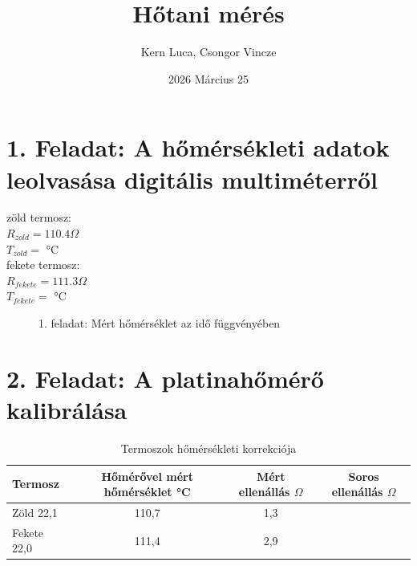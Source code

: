 \documentclass{article}
\title{Hőtani mérés}
\author{Kern Luca, Csongor Vincze}
\date{2026 Március 25}
\begin{document}
\maketitle

\section*{1. Feladat: A hőmérsékleti adatok leolvasása digitális multiméterről}

 
zöld termosz:\\
$R_{zold}=110.4 \Omega$\\
$T_{zold}= \text{ °C}$\\
fekete termosz:\\
$R_{fekete}=111.3 \Omega$\\
$T_{fekete}= \text{ °C}$\\


\begin{figure}[H]
    \centering
    \caption*{1. feladat: Mért hőmérséklet az idő függvényében}
    \label{}
\end{figure}

\section*{2. Feladat: A platinahőmérő kalibrálása}

\begin{table}[H]
    \centering
    \begin{tabular}{|l|c|c|c|}
        \hline
        Termosz & Hőmérővel mért hőmérséklet °C & Mért ellenállás $\Omega$ & Soros ellenállás $\Omega$ \\ \hline
        Zöld 22,1  & 110,7 & 1,3 \\ \hline
        Fekete 22,0 & 111,4 & 2,9 \\ \hline
    \end{tabular}
    \caption{Termoszok hőmérsékleti korrekciója}
    \label{tab:hotan_2}
\end{table}
\end{document}
